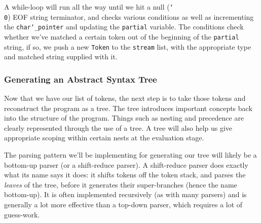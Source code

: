 \documentclass{article}
\newcommand{\code}[1]{\texttt{#1}}
\begin{document}
      A while-loop will run all the way until we hit a null (\code{\char`\\0})
      EOF string terminator, and checks various conditions as well as incrementing
      the \code{char\char`_pointer} and updating the \code{partial} variable.
      The conditions check whether we've matched a certain token out of the beginning
      of the \code{partial} string, if so, we push a new \code{Token} to the
      \code{stream} list, with the appropriate type and matched string supplied
      with it.

    \subsubsection{Generating an Abstract Syntax Tree}\label{ast}
      Now that we have our list of tokens, the next step is to take those tokens
      and reconstruct the program as a tree.  The tree introduces important
      concepts back into the structure of the program.  Things such as nesting
      and precedence are clearly represented through the use of a tree.  A tree
      will also help us give appropriate scoping within certain nests at the
      evaluation stage.

      The parsing pattern we'll be implementing for generating our tree will
      likely be a bottom-up parser (or a shift-reduce parser). A shift-reduce
      parser does exactly what its name says it does:
      it shifts tokens off the token stack, and parses the \emph{leaves} of the
      tree, before it generates their super-branches (hence the name bottom-up).
      It is often implemented recursively (as with many parsers) and is
      generally a lot more effective than a top-down parser, which requires a
      lot of guess-work.
\end{document}
